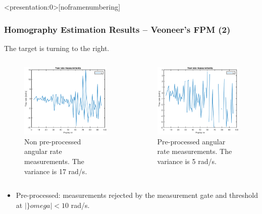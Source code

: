 \documentclass{beamer}
\begin{document}
\begin{frame}<presentation:0>[noframenumbering]
	\frametitle{Homography Estimation Results -- Veoneer's FPM (2)}
	The target is turning to the right.
	\begin{columns}
	\begin{figure}
		\centering
		\includegraphics[width=\textwidth]{Veoneer/155733_AngVel_NoGate_fpm}
		\caption{Non pre-processed angular rate measurements. The variance is 17 rad/s.}
	\end{figure}
	\begin{figure}
		\centering
		\includegraphics[width=\textwidth]{Veoneer/155733_AngVelMeasurements}
		\caption{Pre-processed angular rate measurements. The variance is 5 rad/s.}
	\end{figure}
	\end{columns}

	\note
	{
		\begin{itemize}
			\item Pre-processed: measurements rejected by the measurement gate and threshold at $|\}omega|<10$ rad/s.
		\end{itemize}
	}
\end{frame}
\end{document}
